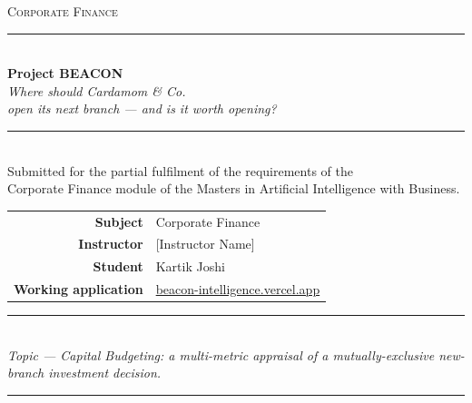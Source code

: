 \documentclass[11pt,a4paper]{article}
\begin{document}
\begin{titlepage}
\centering
\vspace*{1.2cm}

{\large\scshape Corporate Finance}\\[0.4cm]
{\rule{0.55\textwidth}{0.4pt}}\\[1.0cm]

{\Huge\bfseries Project BEACON}\\[0.6cm]
{\Large\itshape Where should Cardamom \& Co.\\open its next branch --- and is it worth opening?}\\[1.2cm]

{\rule{0.55\textwidth}{0.4pt}}\\[1.0cm]

{\normalsize Submitted for the partial fulfilment of the requirements of the\\
Corporate Finance module of the Masters in Artificial Intelligence with Business.}\\[1.6cm]

\begin{tabular}{@{}r@{\hskip 0.6cm}l@{}}
\textbf{Subject} & Corporate Finance\\[0.35cm]
\textbf{Instructor} & [Instructor Name]\\[0.35cm]
\textbf{Student} & Kartik Joshi\\[0.35cm]
\textbf{Working application} & \href{https://beacon-intelligence.vercel.app/}{beacon-intelligence.vercel.app}\\
\end{tabular}

\vfill
{\rule{\textwidth}{0.4pt}}\\[0.3cm]
{\small\itshape Topic --- Capital Budgeting: a multi-metric appraisal of a mutually-exclusive new-branch investment decision.}\\[0.3cm]
{\rule{\textwidth}{0.4pt}}
\end{titlepage}

\tableofcontents
\thispagestyle{plain}
\newpage

\end{document}
